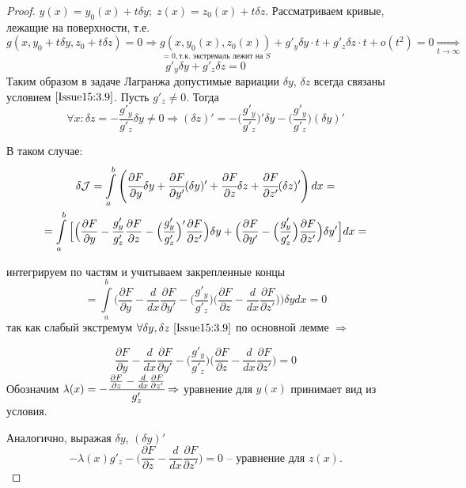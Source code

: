 \begin{proof}
$y(x)=y_0(x)+t\delta y;\;z(x)=z_0(x)+t \delta z.$ Рассматриваем кривые, лежащие на поверхности, т.е. $g(x,y_0+t\delta y,z_0+t \delta z)=0\Rightarrow \underset{=0, \text{т.к. экстремаль лежит на } S}{g(x,y_0(x), z_0(x))}+g'_y\delta y \cdot t + g'_z\delta z \cdot t +o(t^2)=0 \underset{t \rightarrow \infty}{\Rightarrow} $
\begin{equation}
    \label{Issue15:3.9}
    g'_y\delta y + g'_z\delta z = 0
\end{equation}
Таким образом в задаче Лагранжа допустимые вариации $\delta y$, $\delta z$ всегда связаны условием $\eqref{Issue15:3.9}$. Пусть $g'_z\neq 0$. Тогда $$\forall x: \delta z = -\frac{g'_y}{g'_z}\delta y\neq 0\Rightarrow (\delta z)'= -\Big(\frac{g'_y}{g'_z}\Big)'\delta y - \Big(\frac{g'_y}{g'_z}\Big)(\delta y)'$$

В таком случае:
\begin{multline*}
    \delta \mathcal{J}=\int\limits_a^b \left( \cfrac{\partial F}{\partial y}\delta y + \cfrac{\partial F}{\partial y'}(\delta y)' + \cfrac{\partial F}{\partial z}\delta z + \cfrac{\partial F}{\partial z'}(\delta z)' \right)d x = \\ 
    = \int\limits_a^b \Big[\Big(\frac{\partial F}{\partial y}-\frac{g'_y}{g'_z}\frac{\partial F}{\partial z}-\Big(\frac{g'_y}{g'_z}\Big)'\frac{\partial F}{\partial z'}\Big)\delta y + \Big(\frac{\partial F}{\partial y'}- \Big(\frac{g'_y}{g'_z}\Big)\frac{\partial F}{\partial z'}\Big)\delta y'\Big]d x = 
\end{multline*}

интегрируем по частям и учитываем закрепленные концы
\[ 
    =\int\limits_a^b\Big(\frac{\partial F}{\partial y}-\frac{d}{d x}\frac{\partial F}{\partial y'}-\Big(\frac{g'_y}{g'_z}\Big)\Big(\frac{\partial F}{\partial z}-\frac{d}{d x}\frac{\partial F}{\partial z'}\Big) \Big)\delta y d x = 0 
\]
так как слабый экстремум $\forall \delta y, \delta z ~\eqref{Issue15:3.9}$ по основной лемме $\Rightarrow$

$$ \frac{\partial F}{\partial y} - \frac{d}{d x}\frac{\partial F}{\partial y'} - \Big(\frac{g'_y}{g'_z}\Big)\Big(\frac{\partial F}{\partial z}-\frac{d}{d x}\frac{\partial F}{\partial z'}\Big)=0$$
Обозначим $\lambda (x) = -\cfrac{\frac{\partial F}{\partial z}-\frac{d}{d x}\frac{\partial F}{\partial z'}}{g'_z}\Rightarrow$ уравнение для $y(x)$ принимает вид из условия.

Аналогично, выражая $\delta y$, $(\delta y)'$ 
$$-\lambda (x) g'_z-\Big(\frac{\partial F}{\partial z}- \frac{d}{d x}\frac{\partial F}{\partial z'}\Big)=0  \text{ -- уравнение для $z(x)$.}$$
\end{proof}